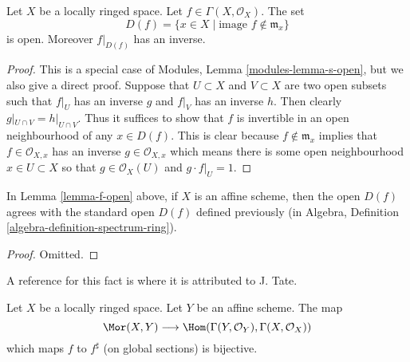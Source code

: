 \begin{lemma}
\label{lemma-f-open}
Let $X$ be a locally ringed space.
Let $f \in \Gamma(X, \mathcal{O}_X)$.
The set
$$
D(f) = \{x \in X \mid \text{image }f \not\in \mathfrak m_x\}
$$
is open. Moreover $f|_{D(f)}$ has an inverse.
\end{lemma}

\begin{proof}
This is a special case of Modules, Lemma \ref{modules-lemma-s-open}, but
we also give a direct proof.
Suppose that $U \subset X$ and $V \subset X$ are
two open subsets such that $f|_U$ has an inverse
$g$ and $f|_V$ has an inverse $h$. Then clearly
$g|_{U\cap V} = h|_{U\cap V}$. Thus it suffices
to show that $f$ is invertible in an open neighbourhood
of any $x \in D(f)$. This is clear because
$f \not \in \mathfrak m_x$ implies that $f \in \mathcal{O}_{X, x}$
has an inverse $g \in \mathcal{O}_{X, x}$ which means there
is some open neighbourhood $x \in U \subset X$ so
that $g \in \mathcal{O}_X(U)$ and $g\cdot f|_U = 1$.
\end{proof}

\begin{lemma}
\label{lemma-f-open-affine}
In Lemma \ref{lemma-f-open} above, if $X$ is an affine scheme,
then the open $D(f)$ agrees with the standard open $D(f)$
defined previously (in
Algebra, Definition \ref{algebra-definition-spectrum-ring}).
\end{lemma}

\begin{proof}
Omitted.
\end{proof}

\begin{lemma}
\label{lemma-morphism-into-affine}
\begin{reference}
A reference for this fact is \cite[II, Err 1, Prop. 1.8.1]{EGA}
where it is attributed to J. Tate.
\end{reference}
Let $X$ be a locally ringed space.
Let $Y$ be an affine scheme.
The map
$$
\Mor(X, Y)
\longrightarrow
\Hom(\Gamma(Y, \mathcal{O}_Y), \Gamma(X, \mathcal{O}_X))
$$
which maps $f$ to $f^\sharp$ (on global sections) is bijective.
\end{lemma}

